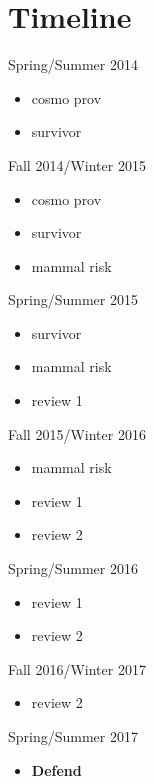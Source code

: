 \documentclass[12pt,letterpaper]{article}
\begin{document}
\clearpage
\section{Timeline}

Spring/Summer 2014
\begin{itemize}
  \item cosmo prov
  \item survivor
\end{itemize}

Fall 2014/Winter 2015
\begin{itemize}
  \item cosmo prov
  \item survivor
  \item mammal risk
\end{itemize}

Spring/Summer 2015
\begin{itemize}
  \item survivor
  \item mammal risk
  \item review 1
\end{itemize}

Fall 2015/Winter 2016
\begin{itemize}
  \item mammal risk
  \item review 1
  \item review 2
\end{itemize}

Spring/Summer 2016
\begin{itemize}
  \item review 1
  \item review 2
\end{itemize}

Fall 2016/Winter 2017
\begin{itemize}
  \item review 2
\end{itemize}

Spring/Summer 2017
\begin{itemize}
  \item \textbf{Defend}
\end{itemize}



\clearpage


\end{document}
